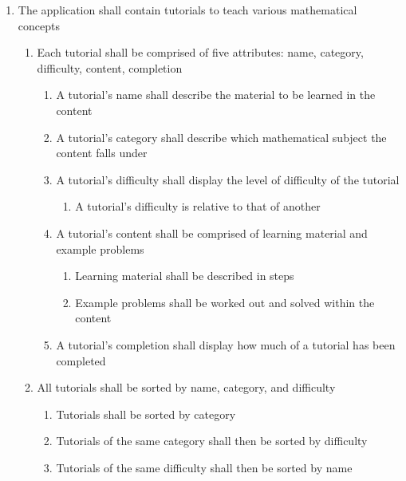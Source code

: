 \documentclass[12pt,letterpaper,oneside]{article}
\begin{document}
\begin{enumerate}
	\item
		The application shall contain tutorials to teach various mathematical concepts
		\begin{enumerate}
			\item
				Each tutorial shall be comprised of five attributes: name, category, difficulty, content, completion
				\begin{enumerate}
					\item
						A tutorial's name shall describe the material to be learned in the content
					\item
						A tutorial's category shall describe  which mathematical subject the content falls under
					\item
						A tutorial's difficulty shall display the level of difficulty of the tutorial
						\begin{enumerate}
							\item
								A tutorial's difficulty is relative to that of another
						\end{enumerate}
					\item
						A tutorial's content shall be comprised of learning material and example problems
						\begin{enumerate}
							\item
								Learning material shall be described in steps
							\item
								Example problems shall be worked out and solved within the content
						\end{enumerate}
					\item
						A tutorial's completion shall display how much of a tutorial has been completed
				\end{enumerate}
			\item
				All tutorials shall be sorted by name, category, and difficulty
				\begin{enumerate}
					\item
						Tutorials shall be sorted by category
					\item
						Tutorials of the same category shall then be sorted by difficulty
					\item
						Tutorials of the same difficulty shall then be sorted by name
				\end{enumerate}
		\end{enumerate}


\end{enumerate}
\end{document}

